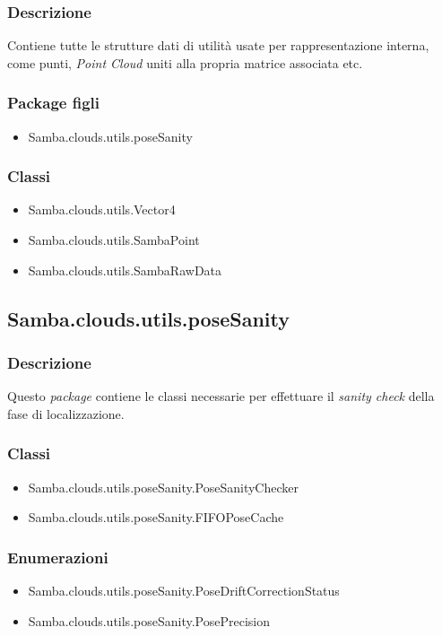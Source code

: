 \subsubsection{Descrizione}
Contiene tutte le strutture dati di utilità usate per rappresentazione interna, come punti, \emph{Point Cloud} uniti alla propria matrice associata etc.
\subsubsection{Package figli}
\begin{itemize}
	\item Samba.clouds.utils.poseSanity
\end{itemize}
\subsubsection{Classi}
\begin{itemize}
	\item Samba.clouds.utils.Vector4
	\item Samba.clouds.utils.SambaPoint
	\item Samba.clouds.utils.SambaRawData
\end{itemize}

\subsection{Samba.clouds.utils.poseSanity}
\subsubsection{Descrizione}
Questo \emph{package} contiene le classi necessarie per effettuare il \emph{sanity check} della fase di localizzazione.
\subsubsection{Classi}
\begin{itemize}
	\item Samba.clouds.utils.poseSanity.PoseSanityChecker
	\item Samba.clouds.utils.poseSanity.FIFOPoseCache
\end{itemize}
\subsubsection{Enumerazioni}
\begin{itemize}
	\item Samba.clouds.utils.poseSanity.PoseDriftCorrectionStatus
	\item Samba.clouds.utils.poseSanity.PosePrecision
\end{itemize}

